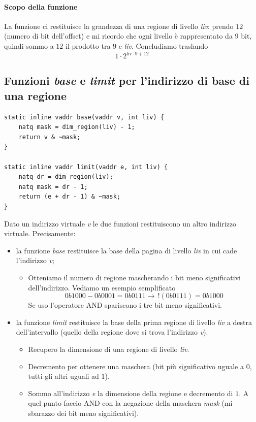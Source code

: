 \documentclass[11pt]{report}
\theoremstyle{definition}
\begin{document}
\paragraph{Scopo della funzione} La funzione ci restituisce la grandezza di una regione di livello \emph{liv}: prendo $12$ (numero di bit dell'offset) e mi ricordo che ogni livello è rappresentato da $9$ bit, quindi sommo a $12$ il prodotto tra $9$ e \emph{liv}. Concludiamo traslando
\[1 \cdot 2^{\text{liv} \cdot 9 + 12}\]

\subsection{Funzioni \emph{base} e \emph{limit} per l'indirizzo di base di una regione}
\small 
\begin{verbatim}
static inline vaddr base(vaddr v, int liv) {
    natq mask = dim_region(liv) - 1;
    return v & ~mask;
}

static inline vaddr limit(vaddr e, int liv) {
    natq dr = dim_region(liv);
    natq mask = dr - 1;
    return (e + dr - 1) & ~mask;
}
\end{verbatim}
\normalsize 
Dato un indirizzo virtuale \emph{v} le due funzioni restituiscono un altro indirizzo virtuale. Precisamente:
\begin{itemize}
	\item la funzione \emph{base} restituisce la base della pagina di livello \emph{liv} in cui cade l'indirizzo \emph{v};
	\begin{itemize}
		\item Otteniamo il numero di regione mascherando i bit meno significativi dell'indirizzo. Vediamo un esempio semplificato
		\[0b1000 - 0b0001 = 0b0111 \longrightarrow \,!(0b0111)=0b1000\]
		Se uso l'operatore AND spariscono i tre bit meno significativi.
	\end{itemize}
	\item la funzione \emph{limit} restituisce la base della prima regione di livello \emph{liv} a destra dell'intervallo (quello della regione dove si trova l'indirizzo \emph{v}).
	\begin{itemize}
		\item Recupero la dimensione di una regione di livello \emph{liv}.
		\item  Decremento per ottenere una maschera (bit più significativo uguale a $0$, tutti gli altri uguali ad $1$).
		\item Sommo all'indirizzo \emph{e} la dimensione della regione e decremento di $1$. A quel punto faccio AND con la negazione della maschera \emph{mask} (mi sbarazzo dei bit meno significativi).
	\end{itemize}
\end{itemize}
\end{document}
